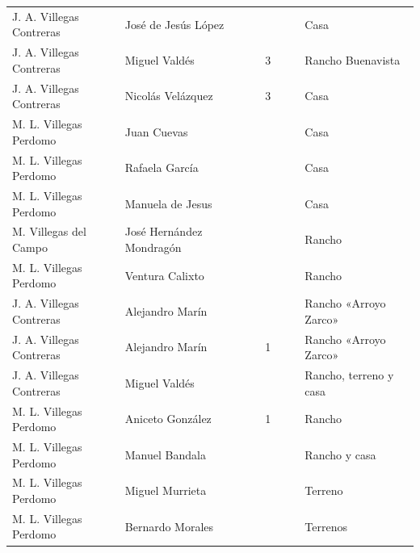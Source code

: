 \documentclass[14pt,twoside,final]{extbook} %
\begin{document}
{\begin{longtable}[c]{@{}p{2.5cm}lrSrrl@{}}
J. A. Villegas Contreras & José de Jesús López &  & {} & {} & {} & Casa \\
J. A. Villegas Contreras & Miguel Valdés &  & 3 &  &  & Rancho Buenavista \\
J. A. Villegas Contreras & Nicolás Velázquez &  & 3 &  &  & Casa \\
M. L. Villegas Perdomo & Juan Cuevas &  & {} & {} & {} & Casa \\
M. L. Villegas Perdomo & Rafaela García &  & {} & {} & {} & Casa \\
M. L. Villegas Perdomo & Manuela de Jesus &  & {} & {} & {} & Casa \\
M. Villegas del Campo & José Hernández Mondragón &  & {} & {} & {} & Rancho \\
M. L. Villegas Perdomo & Ventura Calixto &  & {} & {} & {} & Rancho \\
J. A. Villegas Contreras & Alejandro Marín &  & {} &  &  & Rancho «Arroyo Zarco» \\
J. A. Villegas Contreras & Alejandro Marín &  & 1 &  &  & Rancho «Arroyo Zarco» \\
J. A. Villegas Contreras & Miguel Valdés &  & {} &  &  & Rancho, terreno y casa \\
M. L. Villegas Perdomo & Aniceto González &  & 1 & {} & {} & Rancho \\
M. L. Villegas Perdomo & Manuel Bandala &  & {} & {} & {} & Rancho y casa \\
M. L. Villegas Perdomo & Miguel Murrieta &  & {} & {} & {} & Terreno \\
M. L. Villegas Perdomo & Bernardo Morales &  & {} & {} & {} & Terrenos \\

\end{longtable}}
\end{document}
